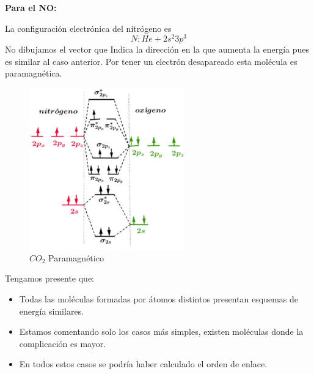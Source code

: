 \textbf{Para el NO:}

La configuración electrónica del nitrógeno es
\begin{equation}
	N: He+ 2s^{2}3p^{3}
\end{equation}
No dibujamos el vector que Indica la dirección en la que aumenta la energía pues es similar al caso anterior.
Por tener un electrón desapareado esta molécula es paramagnética.

\begin{figure}[H]
    \centering
    \includegraphics[width=0.6\textwidth]{./Figures/CO2Paramagnetico}
	\caption{$CO_{2}$ Paramagnético}
	\label{fig:CO2Paramagnetico}
\end{figure}

Tengamos presente que:

\begin{itemize}
	\item Todas las moléculas formadas por átomos distintos presentan esquemas de energía similares.
	\item Estamos comentando solo los casos más simples, existen moléculas donde la complicación es mayor.
	\item En todos estos casos se podría haber calculado el orden de enlace.
\end{itemize}

